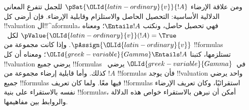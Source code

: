 \documentclass[../../../include/open-logic-section]{subfiles}
\begin{document}
ومن علاقة الإرضاء $\pSat{{\OLId{latin-ordinary}{v}}}{!A}$ للجمل تتفرع المعاني الدلالية الأساسية: التحصيل الحاصل والاستلزام وقابلية الإرضاء. فإن أرضى كل
!!{valuation} ال!!^a{formula}، فهي تحصيل حاصل، ونكتب
$\Entails !A$؛ ومعناه $\pValue{{\OLId{latin-ordinary}{v}}}(!A) = \True$ لكل~$\pAssign{{\OLId{latin-ordinary}{v}}}$.
وإذا كانت مجموعة من !!{formula}s تستلزمها، كتبنا
${\OLId{greek-variable}{Gamma}} \Entails !A$؛ ومعناه أن كل !!{valuation} يرضي جميع
!!{formula}s في~${\OLId{greek-variable}{Gamma}}$ يرضي~$!A$ كذلك.
وأما قابلية إرضاء مجموعة من !!{formula}s فأن يوجد
!!{valuation} واحد يرضي جميع !!{formula}s فيها معًا.
ولما كان تعريف !!{formula}s استقرائيًا، وكان تعريف الإرضاء نفسه بالاستقراء على بنية
!!{formula}s، أمكن أن نبرهن بالاستقراء خواص هذه الدلالة والروابط بين مفاهيمها.
\end{document}
